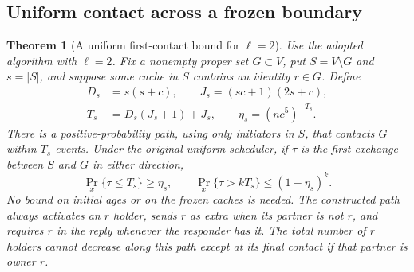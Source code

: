 \documentclass[11pt]{article}
\newtheorem{theorem}{Theorem}
\begin{document}
\subsection{Uniform contact across a frozen boundary}

\begin{theorem}[A uniform first-contact bound for $\ell=2$]
\label{thm:firstcontact}
Use the adopted algorithm with $\ell=2$.
Fix a nonempty proper set $G\subset V$, put $S=V\setminus G$
and $s=|S|$, and suppose some cache in $S$ contains an
identity $r\in G$. Define
\[
 \begin{split}
 D_s&=s(s+c),\qquad J_s=(sc+1)(2s+c),\\
 T_s&=D_s(J_s+1)+J_s,\qquad
 \eta_s=(nc^5)^{-T_s}.
 \end{split}
\]
There is a positive-probability path, using only initiators
in $S$, that contacts $G$ within $T_s$ events.
Under the original uniform scheduler, if $\tau$ is the
first exchange between $S$ and $G$ in either direction,
\[
 \Pr_x\{\tau\le T_s\}\ge\eta_s,\qquad
 \Pr_x\{\tau>kT_s\}\le(1-\eta_s)^k.
\]
No bound on initial ages or on the frozen caches is needed.
The constructed path always activates an $r$ holder,
sends $r$ as extra when its partner is not $r$, and
requires $r$ in the reply whenever the responder has it.
The total number of $r$ holders cannot decrease along
this path except at its final contact if that partner
is owner $r$.
\end{theorem}
\end{document}
